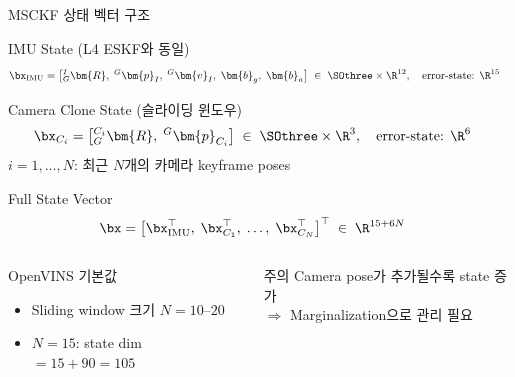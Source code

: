 \begin{frame}[shrink=10]{MSCKF 상태 벡터 구조}
  \begin{block}{IMU State (L4 ESKF와 동일)}
    \begin{align*}
      \bx_{\text{IMU}} &= \bigl[{}^I_G\bm{R},\; {}^G\bm{p}_I,\; {}^G\bm{v}_I,\; \bm{b}_g,\; \bm{b}_a\bigr]
      \;\in\; \SOthree \times \R^{12}, \quad \text{error-state: } \R^{15}
    \end{align*}
  \end{block}
  \begin{block}{Camera Clone State (슬라이딩 윈도우)}
    \begin{align*}
      \bx_{C_i} &= \bigl[{}^{C_i}_G\bm{R},\; {}^G\bm{p}_{C_i}\bigr]
      \;\in\; \SOthree \times \R^3, \quad \text{error-state: } \R^6
    \end{align*}
    $i = 1, \ldots, N$: 최근 $N$개의 카메라 keyframe poses
  \end{block}
  \begin{block}{Full State Vector}
    \begin{align*}
      \bx &= \bigl[\bx_{\text{IMU}}^\top,\; \bx_{C_1}^\top,\; \ldots,\; \bx_{C_N}^\top\bigr]^\top
      \;\in\; \R^{15 + 6N}
    \end{align*}
  \end{block}
  \begin{columns}[T]
      \begin{exampleblock}{OpenVINS 기본값}
        \begin{itemize}
          \item Sliding window 크기 $N = 10\text{--}20$
          \item $N=15$: state dim $= 15 + 90 = 105$
        \end{itemize}
      \end{exampleblock}
      \begin{alertblock}{주의}
        Camera pose가 추가될수록 state 증가\\
        $\Rightarrow$ Marginalization으로 관리 필요
      \end{alertblock}
  \end{columns}
\end{frame}


